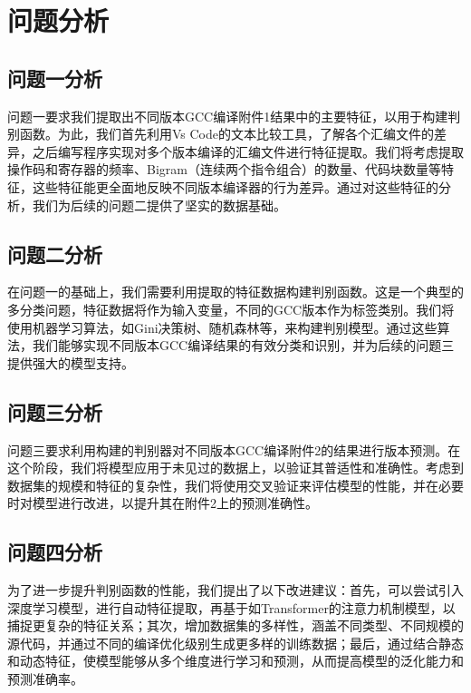 \section{问题分析}
\subsection{问题一分析}
问题一要求我们提取出不同版本GCC编译附件1结果中的主要特征，以用于构建判别函数。为此，我们首先利用Vs Code的文本比较工具，了解各个汇编文件的差异，之后编写程序实现对多个版本编译的汇编文件进行特征提取。我们将考虑提取操作码和寄存器的频率、Bigram（连续两个指令组合）的数量、代码块数量等特征，这些特征能更全面地反映不同版本编译器的行为差异。通过对这些特征的分析，我们为后续的问题二提供了坚实的数据基础。

\subsection{问题二分析}
在问题一的基础上，我们需要利用提取的特征数据构建判别函数。这是一个典型的多分类问题，特征数据将作为输入变量，不同的GCC版本作为标签类别。我们将使用机器学习算法，如Gini决策树、随机森林等，来构建判别模型。通过这些算法，我们能够实现不同版本GCC编译结果的有效分类和识别，并为后续的问题三提供强大的模型支持。

\subsection{问题三分析}
问题三要求利用构建的判别器对不同版本GCC编译附件2的结果进行版本预测。在这个阶段，我们将模型应用于未见过的数据上，以验证其普适性和准确性。考虑到数据集的规模和特征的复杂性，我们将使用交叉验证来评估模型的性能，并在必要时对模型进行改进，以提升其在附件2上的预测准确性。

\subsection{问题四分析}
为了进一步提升判别函数的性能，我们提出了以下改进建议：首先，可以尝试引入深度学习模型，进行自动特征提取，再基于如Transformer的注意力机制模型，以捕捉更复杂的特征关系；其次，增加数据集的多样性，涵盖不同类型、不同规模的源代码，并通过不同的编译优化级别生成更多样的训练数据；最后，通过结合静态和动态特征，使模型能够从多个维度进行学习和预测，从而提高模型的泛化能力和预测准确率。
